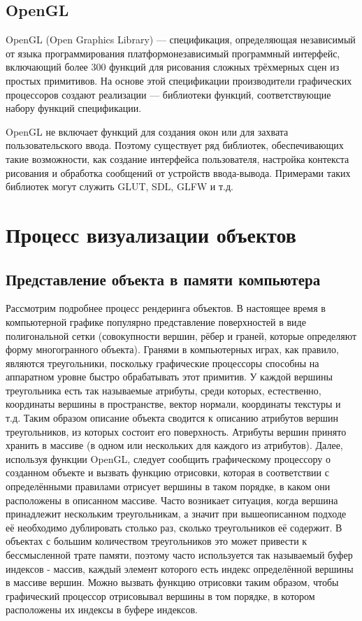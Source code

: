 \subsection{OpenGL}
OpenGL (Open Graphics Library) ---  спецификация, определяющая независимый от языка программирования 
платформонезависимый программный интерфейс, включающий более 300 функций для рисования сложных 
трёхмерных сцен из простых примитивов. На основе этой спецификации производители графических процессоров
создают реализации --- библиотеки функций, соответствующие набору функций спецификации.

OpenGL не включает функций для создания окон или для захвата пользовательского ввода. Поэтому существует 
ряд библиотек, обеспечивающих такие возможности, как создание интерфейса пользователя, настройка контекста 
рисования и обработка сообщений от устройств ввода-вывода.  Примерами таких библиотек могут служить GLUT, SDL, GLFW и т.д.


\section{Процесс визуализации объектов}
\subsection{Представление объекта в памяти компьютера}
Рассмотрим подробнее процесс рендеринга объектов. В настоящее время в компьютерной графике популярно представление
поверхностей в виде полигональной сетки (совокупности вершин, рёбер и граней, которые определяют форму многогранного объекта). 
Гранями в компьютерных играх, как правило, являются треугольники, поскольку графические процессоры 
способны на аппаратном уровне быстро обрабатывать этот примитив. У каждой вершины треугольника есть так называемые 
атрибуты, среди которых, естественно, координаты вершины в пространстве, вектор нормали, координаты текстуры и т.д. 
Таким образом описание объекта сводится к описанию атрибутов вершин треугольников, из которых состоит его поверхность. 
Атрибуты вершин принято хранить в массиве (в одном или нескольких для каждого из атрибутов). Далее, 
используя функции OpenGL, следует сообщить графическому процессору о созданном объекте и вызвать функцию отрисовки, 
которая в соответствии с определёнными правилами отрисует вершины в таком порядке, 
в каком они расположены в описанном массиве. Часто возникает ситуация, когда вершина принадлежит нескольким треугольникам, 
а значит при вышеописанном подходе её необходимо дублировать столько раз, сколько треугольников её содержит. 
В объектах с большим количеством треугольников это может привести к бессмысленной трате памяти, поэтому 
часто используется так называемый буфер индексов - массив, каждый элемент которого есть индекс определённой вершины
в массиве вершин. Можно вызвать функцию отрисовки таким образом, чтобы графический процессор отрисовывал вершины в 
том порядке, в котором расположены их индексы в буфере индексов.
